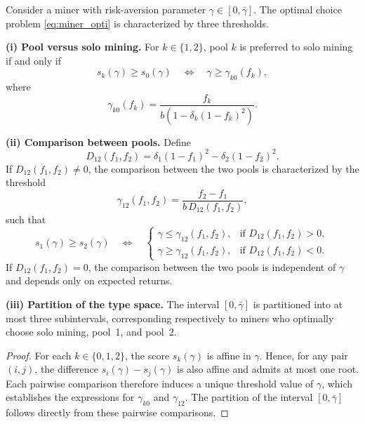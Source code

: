\begin{prop}\label{prop:threshold_structure}
Consider a miner with risk-aversion parameter $\gamma \in [0,\bar{\gamma}]$. The optimal choice problem \eqref{eq:miner_opti} is characterized by three thresholds.

\medskip

\noindent\textbf{(i) Pool versus solo mining.}  
For $k\in\{1,2\}$, pool $k$ is preferred to solo mining if and only if
\begin{equation*}
s_k(\gamma)\ge s_0(\gamma)
\quad\Longleftrightarrow\quad
\gamma \ge \gamma_{k0}(f_k),
\end{equation*}
where
\begin{equation}
\gamma_{k0}(f_k)
=
\frac{f_k}{b\left(1-\delta_k(1-f_k)^2\right)}.
\end{equation}

\medskip

\noindent\textbf{(ii) Comparison between pools.}  
Define
\begin{equation}
D_{12}(f_1,f_2)
=
\delta_1(1-f_1)^2-\delta_2(1-f_2)^2.
\end{equation}
If $D_{12}(f_1,f_2)\neq 0$, the comparison between the two pools is characterized by the threshold
\begin{equation}
\gamma_{12}(f_1,f_2)
=
\frac{f_2-f_1}{b\,D_{12}(f_1,f_2)},
\end{equation}
such that
\begin{equation}
s_1(\gamma)\ge s_2(\gamma)
\quad\Longleftrightarrow\quad
\begin{cases}
\gamma \le \gamma_{12}(f_1,f_2), & \text{if } D_{12}(f_1,f_2)>0,\\
\gamma \ge \gamma_{12}(f_1,f_2), & \text{if } D_{12}(f_1,f_2)<0.
\end{cases}
\end{equation}
If $D_{12}(f_1,f_2)=0$, the comparison between the two pools is independent of $\gamma$ and depends only on expected returns.

\medskip

\noindent\textbf{(iii) Partition of the type space.}  
The interval $[0,\bar{\gamma}]$ is partitioned into at most three subintervals, corresponding respectively to miners who optimally choose solo mining, pool~1, and pool~2.
\end{prop}

\begin{proof}
For each $k\in\{0,1,2\}$, the score $s_k(\gamma)$ is affine in $\gamma$. Hence, for any pair $(i,j)$, the difference $s_i(\gamma)-s_j(\gamma)$ is also affine and admits at most one root. Each pairwise comparison therefore induces a unique threshold value of $\gamma$, which establishes the expressions for $\gamma_{k0}$ and $\gamma_{12}$. The partition of the interval $[0,\bar{\gamma}]$ follows directly from these pairwise comparisons.
\end{proof}

